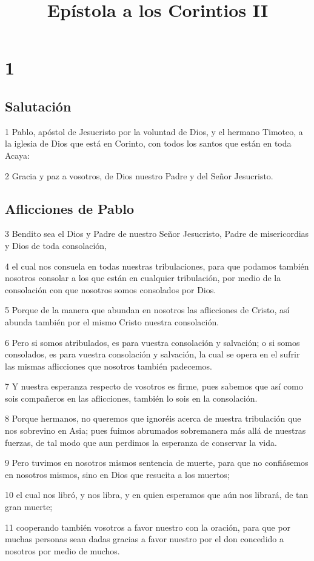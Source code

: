 
\title{Epístola a los Corintios II}

\chapter{1}

\section*{Salutación}

\par 1 Pablo, apóstol de Jesucristo por la voluntad de Dios, y el hermano Timoteo, a la iglesia de Dios que está en Corinto, con todos los santos que están en toda Acaya:
\par 2 Gracia y paz a vosotros, de Dios nuestro Padre y del Señor Jesucristo.

\section*{Aflicciones de Pablo}

\par 3 Bendito sea el Dios y Padre de nuestro Señor Jesucristo, Padre de misericordias y Dios de toda consolación,
\par 4 el cual nos consuela en todas nuestras tribulaciones, para que podamos también nosotros consolar a los que están en cualquier tribulación, por medio de la consolación con que nosotros somos consolados por Dios.
\par 5 Porque de la manera que abundan en nosotros las aflicciones de Cristo, así abunda también por el mismo Cristo nuestra consolación.
\par 6 Pero si somos atribulados, es para vuestra consolación y salvación; o si somos consolados, es para vuestra consolación y salvación, la cual se opera en el sufrir las mismas aflicciones que nosotros también padecemos.
\par 7 Y nuestra esperanza respecto de vosotros es firme, pues sabemos que así como sois compañeros en las aflicciones, también lo sois en la consolación.
\par 8 Porque hermanos, no queremos que ignoréis acerca de nuestra tribulación que nos sobrevino en Asia; pues fuimos abrumados sobremanera más allá de nuestras fuerzas, de tal modo que aun perdimos la esperanza de conservar la vida.
\par 9 Pero tuvimos en nosotros mismos sentencia de muerte, para que no confiásemos en nosotros mismos, sino en Dios que resucita a los muertos;
\par 10 el cual nos libró, y nos libra, y en quien esperamos que aún nos librará, de tan gran muerte;
\par 11 cooperando también vosotros a favor nuestro con la oración, para que por muchas personas sean dadas gracias a favor nuestro por el don concedido a nosotros por medio de muchos.

